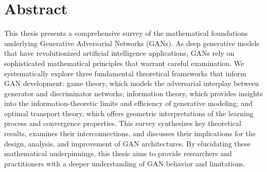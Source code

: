 \section{Abstract}
\begin{center}
  \begin{minipage}[center]{0.7\linewidth}
    This thesis presents a comprehensive survey of the mathematical foundations 
    underlying Generative Adversarial Networks (GANs). As deep generative models 
    that have revolutionized artificial intelligence applications, GANs rely on 
    sophisticated mathematical principles that warrant careful examination. 
    We systematically explore three fundamental theoretical frameworks that 
    inform GAN development: game theory, which models the adversarial interplay 
    between generator and discriminator networks; information theory, which 
    provides insights into the information-theoretic limits and efficiency of 
    generative modeling; and optimal transport theory, which offers geometric 
    interpretations of the learning process and convergence properties. This 
    survey synthesizes key theoretical results, examines their interconnections, 
    and discusses their implications for the design, analysis, and improvement 
    of GAN architectures. By elucidating these mathematical underpinnings, 
    this thesis aims to provide researchers and practitioners with a deeper 
    understanding of GAN behavior and limitations.
  \end{minipage}
\end{center}


